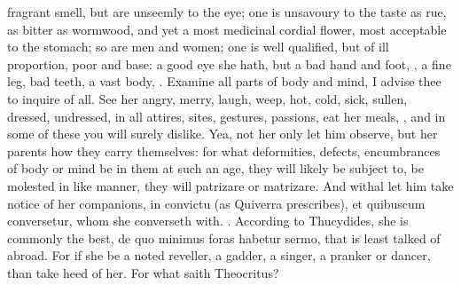 fragrant smell, but are unseemly to the eye; one is unsavoury to the
taste as rue, as bitter as wormwood, and yet a most medicinal cordial
flower, most acceptable to the stomach; so are men and women; one is
well qualified, but of ill proportion, poor and base: a good eye she
hath, but a bad hand and foot, , a fine leg,
bad teeth, a vast body, \etc{}. Examine all parts of body and mind, I
advise thee to inquire of all. See her angry, merry, laugh, weep, hot,
cold, sick, sullen, dressed, undressed, in all attires, sites,
gestures, passions, eat her meals, \etc{}, and in some of these you will
surely dislike. Yea, not her only let him observe, but her parents how
they carry themselves: for what deformities, defects, encumbrances of
body or mind be in them at such an age, they will likely be subject to,
be molested in like manner, they will patrizare or matrizare. And
withal let him take notice of her companions, in convictu (as Quiverra
prescribes), et quibuscum conversetur, whom she converseth with.
. According to
Thucydides, she is commonly the best, de quo minimus foras habetur
sermo, that is least talked of abroad. For if she be a noted reveller,
a gadder, a singer, a pranker or dancer, than take heed of her. For
what saith Theocritus?


